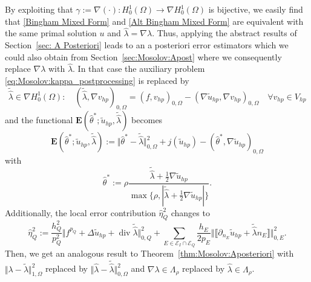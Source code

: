 \documentclass[12pt,twoside,reqno]{amsart}
\theoremstyle{definition}
\numberwithin{equation}{section}
\newcommand{\E} {\bm{E}}
\newcommand{\norm}[1]    {\Vert #1 \Vert}
\begin{document}
By exploiting that $\gamma:=\nabla(\cdot):H^1_0(\Omega)\to\nabla H^1_0(\Omega)$ is bijective, we easily find that \eqref{Bingham Mixed Form} and \eqref{Alt Bingham Mixed Form} are equivalent with the same primal solution $u$ and $\hat{\lambda} = \nabla \lambda$. 
Thus, applying the abstract results of Section~\ref{sec: A Posteriori} leads to an a posteriori error estimators which we could also obtain from Section~\ref{sec:Mosolov:Apost} where we consequently replace $\nabla \lambda$ with $\hat{\lambda}$.
In that case the auxiliary problem \eqref{eq:Mosolov:kappa_postprocessing} is replaced by 
                \begin{equation*}
                  \tilde{\hat\lambda} \in \nabla H^1_0(\Omega): \quad  (\tilde{\hat\lambda},\nabla v_{hp})_{0,\Omega} = (f,v_{hp})_{0,\Omega}-(\nabla \tilde{u}_{hp},\nabla v_{hp})_{0,\Omega} \quad \forall v_{hp} \in V_{hp}
                \end{equation*}
                and the functional $\E(\hat\theta^*;\tilde{u}_{hp},\tilde{\hat\lambda})$ becomes
                \begin{equation*}
                    \bm{E}(\hat\theta^*;\tilde{u}_{hp},\tilde{\hat\lambda}):=\norm{\hat\theta^*-\tilde{\hat\lambda}}_{0,\Omega}^2+ j(\tilde{u}_{hp})-(\hat\theta^*,\nabla \tilde{u}_{hp})_{0,\Omega}
                \end{equation*}
                with 
                \begin{equation*}
                    \hat\theta^*:=\rho\frac{\tilde{\hat\lambda}+\frac12\nabla \tilde{u}_{hp}}{\max\{\rho,|\tilde{\hat\lambda}+\frac12 \nabla \tilde{u}_{hp}|\}}.
                \end{equation*}
                Additionally, the local error contribution $\hat\eta_Q^2$ changes to
            \begin{equation*}%
                \hat\eta_Q^2:= \frac{h_Q^2}{p_Q^2}\norm{f^{p_Q}+\Delta \tilde{u}_{hp}+\operatorname{div}\tilde{\hat\lambda}}_{0,Q}^2+ \sum\limits_{E\in \mathcal{E}_I\cap\mathcal{E}_Q}\frac{h_E}{2p_E}\norm{\llbracket \partial_{n_E}\tilde{u}_{hp}+\tilde{\hat\lambda} n_E\rrbracket}_{0,E}^2.
            \end{equation*}
            Then, we get an analogous result to Theorem~\ref{thm:Mosolov:Aposteriori} with $\norm{\lambda-\tilde{\lambda}}_{1,\Omega}^2$ replaced by $\norm{\hat{\lambda}-\tilde{\hat\lambda}}_{0,\Omega}^2$ and  $\nabla\lambda\in\Lambda_\rho$ replaced by $\hat\lambda\in\Lambda_\rho$.           
    
\end{document}
